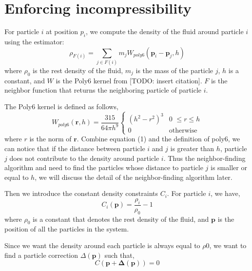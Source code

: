 \documentclass[sigconf]{acmart}
\newcommand{\vect}[1]{\boldsymbol{#1}}
\begin{document}
\section{Enforcing incompressibility}
For particle $i$ at position $p_i$, we compute the density of the fluid around particle $i$ using the estimator:
\begin{equation}
  \rho_{F(i)} = \sum_{j \in F(i)} m_j W_{poly6}(\vect{p}_i - \vect{p}_j, h)
\end{equation}
where $\rho_0$ is the rest density of the fluid, $m_j$ is the mass of the particle $j$, $h$ is a constant, and $W$ is the Poly6 kernel from [TODO: insert citation]. $F$ is the neighbor function that returns the neighboring particle of particle $i$.

The Poly6 kernel is defined as follows,
\begin{equation*}
  W_{poly6}(\vect{r}, h) = \frac{315}{64 \pi h^9}
  \begin{cases}
    (h^2 - r^2)^3 &\text{0 $\leq r \leq h$} \\
    0 &\text{otherwise}
  \end{cases}
\end{equation*}
where $r$ is the norm of $\vect{r}$. Combine equation (1) and the definition of poly6, we can notice that if the distance between particle $i$ and $j$ is greater than $h$, particle $j$ does not contribute to the density around particle $i$. Thus the neighbor-finding algorithm and need to find the particles whose distance to particle $j$ is smaller or equal to $h$, we will discuss the detail of the neighbor-finding algorithm later.

Then we introduce the constant density constraints $C_i$. For particle $i$, we have,
\begin{equation}
  C_i(\vect{p}) = \frac{\rho_i}{\rho_0} - 1
\end{equation}
where $\rho_0$ is a constant that denotes the rest density of the fluid, and $\vect{p}$ is the position of all the particles in the system.

Since we want the density around each particle is always equal to $\rho0$, we want to find a particle correction $\Delta(\vect{p})$ such that,
\begin{equation}
  C(\vect{p} + \vect{\Delta(\vect{p})}) = 0
\end{equation}
\end{document}
